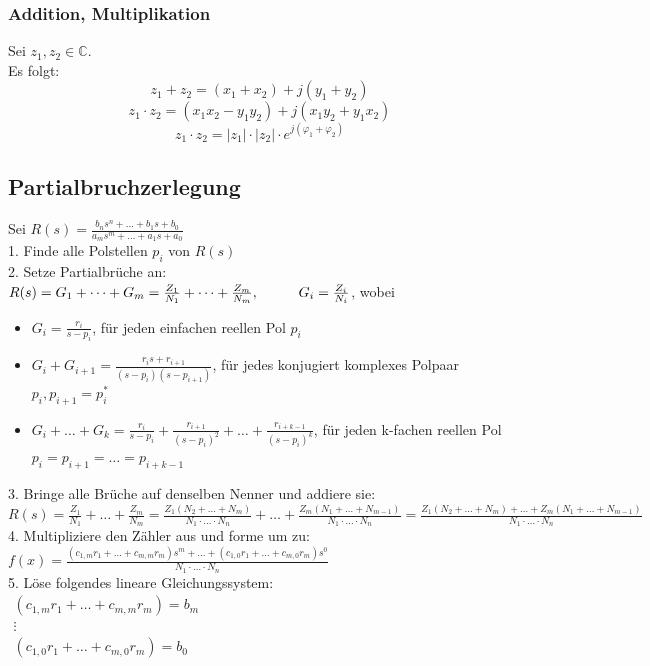 \documentclass[10pt,a4paper]{article}
\newcommand{\tab}[1][1]{\hspace*{#1cm}}
\begin{document}
\subsubsection{Addition, Multiplikation}
Sei $z_1, z_2 \in \mathbb{C}$. \\
Es folgt:
$$
	z_1 + z_2 = (x_1 + x_2) + j(y_1 + y_2)
$$
$$
	z_1 ⋅ z_2 = (x_1x_2 - y_1y_2) + j(x_1y_2 + y_1x_2)
$$
$$
	z_1 ⋅ z_2 = |z_1| ⋅ |z_2| ⋅ e^{j(\varphi_1 + \varphi_2)}
$$

\subsection{Partialbruchzerlegung}
Sei $R(s) = \frac{b_ns^n + \dots + b_1s + b_0}{a_ms^m + \dots + a_1s + a_0}$ \\

1. Finde alle Polstellen $p_i$ von $R(s)$ \\

2. Setze Partialbrüche an: \\
$R(s) = G_1 + \dots + G_m = \frac{Z_1}{N_1} + \dots + \frac{Z_m}{N_m}, \tab G_i = \frac{Z_i}{N_i}$, wobei
\begin{itemize}
	\item $G_i = \frac{r_i}{s - p_i}$, für jeden einfachen reellen Pol $p_i$
	\item $G_i + G_{i+1} = \frac{r_i s + r_{i + 1}}{(s - p_i)(s - p_{i + 1})}$, für jedes konjugiert komplexes Polpaar $p_i, p_{i+1} = p_i^*$
	\item $G_i + \dots + G_k = \frac{r_i}{s - p_i} + \frac{r_{i+1}}{(s - p_i)^2} + \dots + \frac{r_{i + k - 1}}{(s - p_i)^k}$, für jeden k-fachen reellen Pol $p_i = p_{i+1} = \dots = p_{i + k - 1}$
\end{itemize}

3. Bringe alle Brüche auf denselben Nenner und addiere sie: \\
$R(s) = \frac{Z_1}{N_1} + \dots + \frac{Z_m}{N_m} = \frac{Z_1(N_2 + \dots + N_m)}{N_1 ⋅ \dots ⋅ N_n} + \dots + \frac{Z_m(N_1 + \dots + N_{m-1})}{N_1 ⋅ \dots ⋅ N_n} = \frac{Z_1(N_2 + \dots + N_m) + \dots + Z_m(N_1 + \dots + N_{m-1})}{N_1 ⋅ \dots ⋅ N_n}$ \\

4. Multipliziere den Zähler aus und forme um zu: \\
$ f(x) = \frac{(c_{1,m}r_1 + \dots + c_{m,m}r_m)s^m + \dots + (c_{1,0}r_1 + \dots + c_{m,0}r_m)s^0}{N_1 ⋅ \dots ⋅ N_n}$ \\

5. Löse folgendes lineare Gleichungssystem: \\
$\begin{array}{c}
(c_{1,m}r_1 + \dots + c_{m,m}r_m) = b_m \\
\vdots \\
(c_{1,0}r_1 + \dots + c_{m,0}r_m) = b_0
\end{array}$ \\
\end{document}
